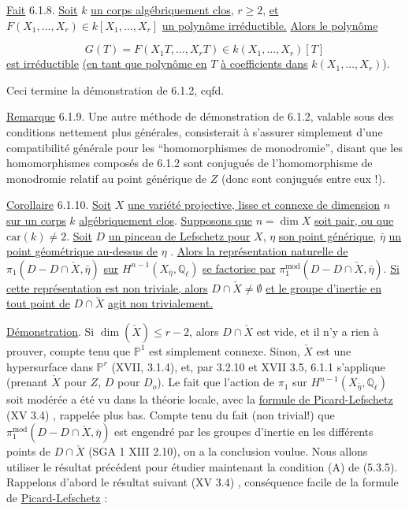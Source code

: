 \underline{Fait} 6.1.8. \underline{Soit} $k$ \underline{un corps algébriquement clos}, $r \geq 2$, \underline{et} $F(X_1,\ldots,X_r) \in k[X_1,\ldots,X_r]$ \underline{un polynôme irréductible.} \underline{Alors le polynôme}

\begin{equation*}
G(T) = F (X_1 T,\ldots,X_r T) \in k (X_1,\ldots,X_r)[T]
\end{equation*}
\underline{est irréductible} \underline{(en tant que polynôme en} $T$ \underline{à coefficients dans} $k(X_1,\ldots,X_r)$).

Ceci termine la démonstration de 6.1.2, cqfd.

\underline{Remarque} 6.1.9. Une autre méthode de démonstration de 6.1.2, valable sous des conditions nettement plus générales, consisterait à s'assurer simplement d'une compatibilité générale pour les ``homomorphismes de monodromie'', disant que les homomorphismes composés de 6.1.2 sont conjugués de l'homomorphisme de monodromie relatif au point générique de $Z$ (donc sont conjugués entre eux !).



\underline{Corollaire} 6.1.10. \underline{Soit} $X$ \underline{une variété projective, lisse et connexe de dimension} $n$ \underline{sur un corps} $k$ \underline{algébriquement clos}. \underline{Supposons que} $n = \dim X$ \underline{soit pair, ou que} $\mathrm{car}(k) \neq 2$. \underline{Soit} $D$ \underline{un pinceau de Lefschetz pour} $X$, $\eta$ \underline{son point générique}, $\bar{\eta}$ \underline{un point géométrique au-dessus de} $\eta$ . \underline{Alors la représentation naturelle de} $\pi_1(D - D \cap \check{X}, \bar{\eta})$ \underline{sur} $H^{n-1}(X_{\bar{\eta}},\mathbb{Q}_\ell)$ \underline{se factorise par} $\pi_1^{\mathrm{mod}}(D - D \cap \check{X}, \bar{\eta})$. \underline{Si cette représentation est non triviale, alors} $D \cap \check{X} \neq \emptyset$ \underline{et le groupe d'inertie en tout point de} $D \cap \check{X}$ \underline{agit non trivialement.}

\underline{Démonstration}. Si $\dim (\check{X}) \leq r-2$, alors $D \cap \check{X}$ est vide, et il n'y a rien à prouver, compte tenu que $\mathbb{P}^1$ est simplement connexe. Sinon, $\check{X}$ est une hypersurface dans $\mathbb{P}^r$ (XVII, 3.1.4), et, par 3.2.10 et XVII 3.5, 6.1.1 s'applique (prenant $\check{X}$ pour $Z$, $D$ pour $D_o$). Le fait que l'action de $\pi_1$ sur $H^{n-1}(X_{\bar{\eta}} , \mathbb{Q}_\ell)$ soit modérée a été vu dans la théorie locale, avec la \underline{formule de Picard-Lefschetz} (XV 3.4) , rappelée plus bas. Compte tenu du fait (non trivial!) que $\pi_1^{\mathrm{mod}}(D - D \cap \check{X}, \bar{\eta})$ est engendré par les groupes d'inertie en les différents points de $D \cap \check{X}$ (SGA 1 XIII 2.10), on a la conclusion voulue. Nous allons utiliser le résultat précédent pour étudier maintenant la condition (A) de (5.3.5). Rappelons d'abord le résultat suivant (XV 3.4) , conséquence facile de la formule de \underline{Picard-Lefschetz} :


